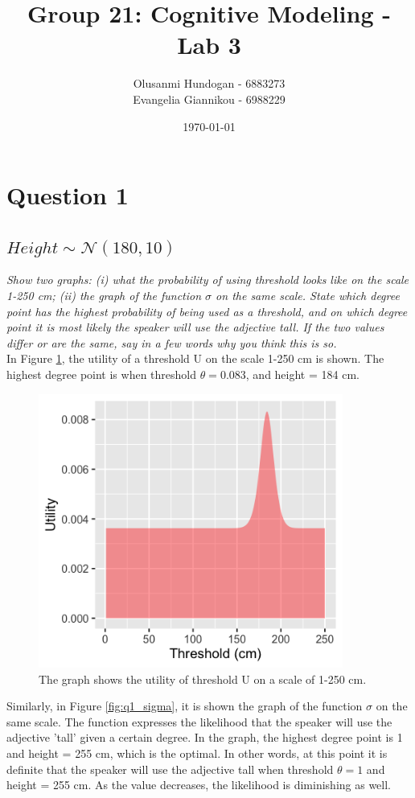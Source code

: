 \documentclass[11pt,a4paper,oneside]{article}
\title{\textbf{Group 21: Cognitive Modeling - Lab 3}}
\date{\today}
\author{Olusanmi Hundogan - 6883273\\
Evangelia Giannikou - 6988229\\
}
\begin{document}
\maketitle

\section{Question 1}
\label{Q1}
\subsection{$Height \sim \mathcal{N}(180, 10)$}
\textit{Show two graphs: (i) what the probability of using threshold looks like on the scale 1-250 cm; (ii) the graph of the function $\sigma$ on the same scale. State which degree point has the highest probability of being used as a threshold, and on which degree point it is most likely the speaker will use the adjective tall. If the two values differ or are the same, say in a few words why you think this is so.}\\

In Figure \ref{fig:q1_threshold}, the utility of a threshold U on the scale 1-250 cm is shown. The highest degree point is when threshold $ \theta = 0.083$, and height = 184 cm.

\begin{figure}[H]
    \centering
    \includegraphics[width=100mm]{figs/Question_1_threshold.png}
    \caption{The graph shows the utility of threshold U on a scale of 1-250 cm.}
  \label{fig:q1_threshold}
\end{figure}

Similarly, in Figure \ref{fig:q1_sigma}, it is shown the graph of the function $\sigma$ on the same scale. The function expresses the likelihood that the speaker will use the adjective 'tall' given a certain degree. In the graph, the highest degree point is 1 and height = 255 cm, which is the optimal. In other words, at this point it is definite that the speaker will use the adjective tall when threshold $ \theta = 1$ and height = 255 cm. As the value decreases, the likelihood is diminishing as well.
\end{document}
